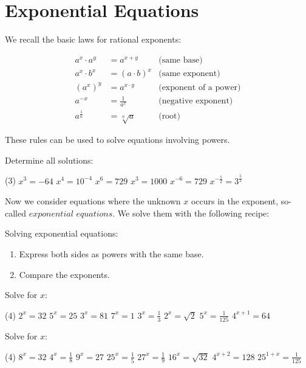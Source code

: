 \section*{Exponential Equations}
We recall the basic laws for rational exponents:
\begin{tcolorbox}
	\begin{align*}
		a^x\cdot a^y&=a^{x+y}&\text{(same base)}\\
		a^x\cdot b^x&=\left(a\cdot b\right)^x&\text{(same exponent)}\\
		\left(a^x\right)^y&=a^{x\cdot y}&\text{(exponent of a power)}\\
		a^{-x}&=\frac{1}{a^x}&\text{(negative exponent)}\\
		a^{\frac{1}{n}}&=\sqrt[n]{a}&\text{(root)}
	\end{align*}
\end{tcolorbox}
These rules can be used to solve equations involving powers.
\begin{exercise}
	Determine all solutions:
	\begin{tasks}(3)
		\task $x^3=-64$
		\task $x^4=10^{-4}$
		\task $x^6=729$
		\task $x^3=1000$
		\task $x^{-6}=729$
		\task $x^{-\frac{5}{2}}=3^{\frac{5}{2}}$
	\end{tasks}
\end{exercise}
Now we consider equations where the unknown $x$ occurs in the exponent, so-called $\textit{exponential equations}$. We solve them with the following recipe:
\begin{tcolorbox}
	Solving exponential equations:
	\begin{enumerate}[Step 1:]
		\item Express both sides as powers with the same base.
		\item Compare the exponents.
	\end{enumerate}
\end{tcolorbox}
\begin{exercise}
	Solve for $x$:
	\begin{tasks}(4)
		\task $2^x=32$
		\task $5^x=25$
		\task $3^x=81$
		\task $7^x=1$
		\task $3^x=\frac{1}{3}$
		\task $2^x=\sqrt{2}$
		\task $5^x=\frac{1}{125}$
		\task $4^{x+1}=64$
	\end{tasks}
\end{exercise}
\begin{exercise}
	Solve for $x$:
	\begin{tasks}(4)
		\task $8^x=32$
		\task $4^x=\frac{1}{8}$
		\task $9^x=27$
		\task $25^x=\frac{1}{5}$
		\task $27^x=\frac{1}{9}$
		\task $16^x=\sqrt{32}$
		\task $4^{x+2}=128$
		\task $25^{1+x}=\frac{1}{125}$
	\end{tasks}
\end{exercise}
